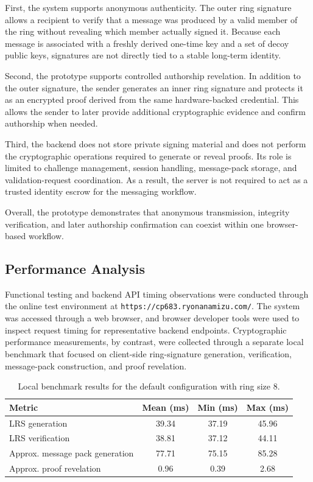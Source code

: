 \documentclass[letterpaper,11pt]{article}
\begin{document}
First, the system supports anonymous authenticity. The outer ring signature allows a recipient to verify that a message was produced by a valid member of the ring without revealing which member actually signed it. Because each message is associated with a freshly derived one-time key and a set of decoy public keys, signatures are not directly tied to a stable long-term identity.

Second, the prototype supports controlled authorship revelation. In addition to the outer signature, the sender generates an inner ring signature and protects it as an encrypted proof derived from the same hardware-backed credential. This allows the sender to later provide additional cryptographic evidence and confirm authorship when needed.

Third, the backend does not store private signing material and does not perform the cryptographic operations required to generate or reveal proofs. Its role is limited to challenge management, session handling, message-pack storage, and validation-request coordination. As a result, the server is not required to act as a trusted identity escrow for the messaging workflow.

Overall, the prototype demonstrates that anonymous transmission, integrity verification, and later authorship confirmation can coexist within one browser-based workflow.

\subsection{Performance Analysis}
Functional testing and backend API timing observations were conducted through the online test environment at \texttt{https://cp683.ryonanamizu.com/}. The system was accessed through a web browser, and browser developer tools were used to inspect request timing for representative backend endpoints. Cryptographic performance measurements, by contrast, were collected through a separate local benchmark that focused on client-side ring-signature generation, verification, message-pack construction, and proof revelation.

\begin{table}[H]
    \centering
    \begin{tabular}{lccc}
        \toprule
        Metric                           & Mean (ms) & Min (ms) & Max (ms) \\
        \midrule
        LRS generation                  & 39.34     & 37.19    & 45.96    \\
        LRS verification                & 38.81     & 37.12    & 44.11    \\
        Approx. message pack generation & 77.71     & 75.15    & 85.28    \\
        Approx. proof revelation        & 0.96      & 0.39     & 2.68     \\
        \bottomrule
    \end{tabular}
    \caption{Local benchmark results for the default configuration with ring size 8.}
\end{table}
\end{document}
